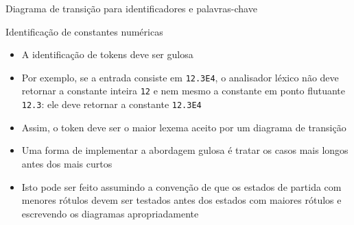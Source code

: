 \begin{frame}[fragile]{Diagrama de transição para identificadores e palavras-chave}

    \begin{figure}
        \centering

    \end{figure}

\end{frame}

\begin{frame}[fragile]{Identificação de constantes numéricas}

    \begin{itemize}
        \item A identificação de tokens deve ser gulosa

        \item Por exemplo, se a entrada consiste em \texttt{12.3E4}, o analisador léxico não deve retornar a constante inteira \texttt{12} e nem mesmo a
            constante em ponto flutuante \texttt{12.3}: ele deve retornar a constante \texttt{12.3E4}

        \item Assim, o token deve ser o maior lexema aceito por um diagrama de transição

        \item Uma forma de implementar a abordagem gulosa é tratar os casos mais longos antes dos mais curtos

        \item Isto pode ser feito assumindo a convenção de que os estados de partida com menores rótulos devem ser testados antes dos estados com maiores
            rótulos e escrevendo os diagramas apropriadamente
    \end{itemize}

\end{frame}

